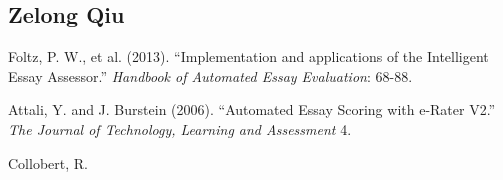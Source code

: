 \documentclass[10pt,psamsfonts]{amsart}
\theoremstyle{definition}
\theoremstyle{remark}
\numberwithin{equation}{section}
\begin{document}
\subsection*{Zelong Qiu}

\begin{thebibliography}{99}
Foltz, P. W., et al. (2013). ``Implementation and applications of the Intelligent Essay Assessor.'' {\em Handbook of Automated Essay Evaluation}: 68-88.

Attali, Y. and J. Burstein (2006). ``Automated Essay Scoring with e-Rater V2.'' {\em The Journal of Technology, Learning and Assessment} 4.

Collobert, R.

\end{thebibliography}
\end{document}
